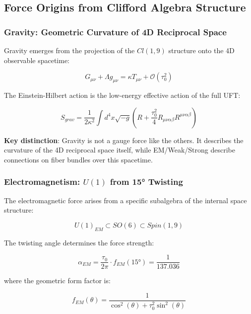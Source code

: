 \subsection{Force Origins from Clifford Algebra Structure}

\subsubsection{Gravity: Geometric Curvature of 4D Reciprocal Space}

Gravity emerges from the projection of the $Cl(1,9)$ structure onto the 4D observable spacetime:

\begin{equation}
    G_{\mu\nu} + \Lambda g_{\mu\nu} = \kappa T_{\mu\nu} + \mathcal{O}(\tau_0^2)
\end{equation}

The Einstein-Hilbert action is the low-energy effective action of the full UFT:

\begin{equation}
    S_{grav} = \frac{1}{2\kappa^2} \int d^4x \sqrt{-g} \left(R + \frac{\tau_0^2}{4} R_{\mu\nu\alpha\beta} R^{\mu\nu\alpha\beta}\right)
\end{equation}

\textbf{Key distinction}: Gravity is not a gauge force like the others. It describes the curvature of the 4D reciprocal space itself, while EM/Weak/Strong describe connections on fiber bundles over this spacetime.

\subsubsection{Electromagnetism: $U(1)$ from 15° Twisting}

The electromagnetic force arises from a specific subalgebra of the internal space structure:

\begin{equation}
    U(1)_{EM} \subset SO(6) \subset Spin(1,9)
\end{equation}

The twisting angle determines the force strength:

\begin{equation}
    \alpha_{EM} = \frac{\tau_0}{2\pi} \cdot f_{EM}(15°) = \frac{1}{137.036}
\end{equation}

where the geometric form factor is:

\begin{equation}
    f_{EM}(\theta) = \frac{1}{\cos^2(\theta) + \tau_0^2 \sin^2(\theta)}
\end{equation}

